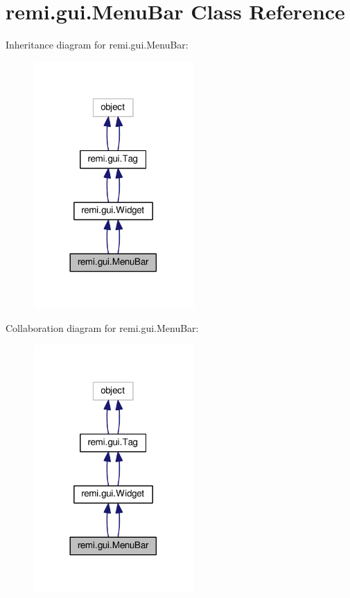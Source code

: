 \hypertarget{classremi_1_1gui_1_1MenuBar}{}\section{remi.\+gui.\+Menu\+Bar Class Reference}
\label{classremi_1_1gui_1_1MenuBar}


Inheritance diagram for remi.\+gui.\+Menu\+Bar\+:
\nopagebreak
\begin{figure}[H]
\begin{center}
\leavevmode
\includegraphics[width=173pt]{dd/da1/classremi_1_1gui_1_1MenuBar__inherit__graph}
\end{center}
\end{figure}


Collaboration diagram for remi.\+gui.\+Menu\+Bar\+:
\nopagebreak
\begin{figure}[H]
\begin{center}
\leavevmode
\includegraphics[width=173pt]{d9/df8/classremi_1_1gui_1_1MenuBar__coll__graph}
\end{center}
\end{figure}
